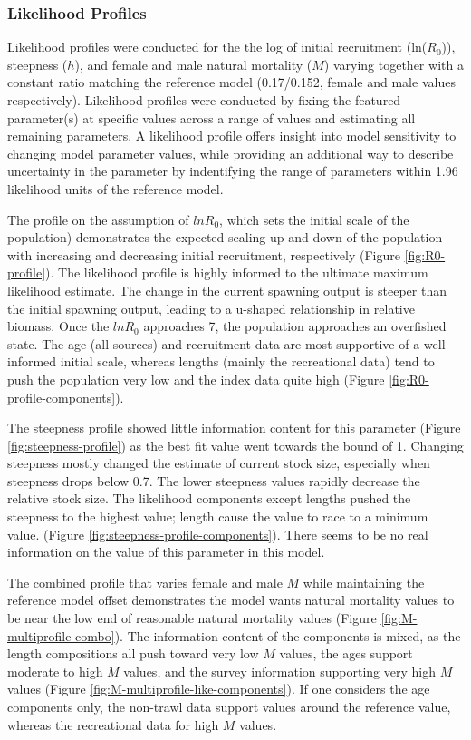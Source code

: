 \documentclass[11pt,
  english,
  letterpaper,
]{article}
\begin{document}
\hypertarget{likelihood-profiles}{%
\subsubsection{Likelihood Profiles}\label{likelihood-profiles}}

Likelihood profiles were conducted for the the log of initial recruitment (ln(\(R_0\))), steepness (\(h\)), and female and male natural mortality (\(M\)) varying together with a constant ratio matching the reference model (0.17/0.152, female and male values respectively). Likelihood profiles were conducted by fixing the featured parameter(s) at specific values across a range of values and estimating all remaining parameters. A likelihood profile offers insight into model sensitivity to changing model parameter values, while providing an additional way to describe uncertainty in the parameter by indentifying the range of parameters within 1.96 likelihood units of the reference model.

The profile on the assumption of \(lnR_0\), which sets the initial scale of the population) demonstrates the expected scaling up and down of the population with increasing and decreasing initial recruitment, respectively (Figure \ref{fig:R0-profile}). The likelihood profile is highly informed to the ultimate maximum likelihood estimate. The change in the current spawning output is steeper than the initial spawning output, leading to a u-shaped relationship in relative biomass. Once the \(lnR_0\) approaches 7, the population approaches an overfished state. The age (all sources) and recruitment data are most supportive of a well-informed initial scale, whereas lengths (mainly the recreational data) tend to push the population very low and the index data quite high (Figure \ref{fig:R0-profile-components}).

The steepness profile showed little information content for this parameter (Figure \ref{fig:steepness-profile}) as the best fit value went towards the bound of 1. Changing steepness mostly changed the estimate of current stock size, especially when steepness drops below 0.7. The lower steepness values rapidly decrease the relative stock size. The likelihood components except lengths pushed the steepness to the highest value; length cause the value to race to a minimum value. (Figure \ref{fig:steepness-profile-components}). There seems to be no real information on the value of this parameter in this model.

The combined profile that varies female and male \(M\) while maintaining the reference model offset demonstrates the model wants natural mortality values to be near the low end of reasonable natural mortality values (Figure \ref{fig:M-multiprofile-combo}). The information content of the components is mixed, as the length compositions all push toward very low \(M\) values, the ages support moderate to high \(M\) values, and the survey information supporting very high \(M\) values (Figure \ref{fig:M-multiprofile-like-components}). If one considers the age components only, the non-trawl data support values around the reference value, whereas the recreational data for high \(M\) values.
\end{document}

